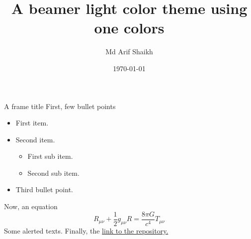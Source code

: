 \documentclass[aspectratio=169]{beamer}
\title{A beamer light color theme using one colors}
\author{Md Arif Shaikh}
\institute{{\color{onecyan}International Centre for Theoretical Sciences, Bangalore, India}}
\date{\today}
\begin{document}
\thispagestyle{empty}
\maketitle

\begin{frame}
  {A frame title}
  First, few bullet points
  \begin{itemize}
  \item First item.
  \item Second item.
    \begin{itemize}
    \item First sub item.
    \item Second sub item.
    \end{itemize}
  \item Third bullet point.
  \end{itemize}
  Now, an equation
  \begin{equation}
    \label{eq:equation}
    R_{\mu\nu} + \frac{1}{2} g_{\mu\nu} R = \frac{8\pi G}{c^4} T_{\mu \nu}
  \end{equation}
  \alert{Some alerted texts}. Finally, the \href{https://github.com/md-arif-shaikh/beamer-one-dark}{link to the repository.}
\end{frame}
\end{document}
